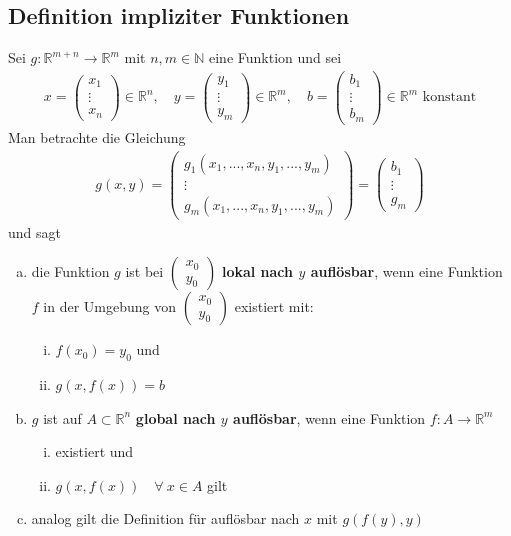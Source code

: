 \documentclass[11pt,a4paper]{book}
\newcommand {\Rn}	{\mathbb{R}^n}
\newcommand {\Rm}	{\mathbb{R}^m}
\newcommand {\Rmn}	{\mathbb{R}^{m+n}}
\newcommand {\N}	{\mathbb{N}}
\newcommand{\1}    	{\mathbbm{1}}
\begin{document}
\subsection{Definition impliziter Funktionen}
Sei \(g: \Rmn \rightarrow \Rm\) mit \(n,m \in \N\) eine Funktion und sei
\begin{align*}
	x = \left( \begin{array}{c}
		x_1 \\ \vdots \\ x_n
	\end{array} \right) \in \Rn, \quad
	y = \left( \begin{array}{c}
		y_1 \\ \vdots \\ y_m
	\end{array} \right) \in \Rm, \quad
	b = \left( \begin{array}{c}
		b_1 \\ \vdots \\ b_m
	\end{array} \right) \in \Rm \textrm{ konstant}
\end{align*}
Man betrachte die Gleichung
\begin{align*}
	g(x,y) = \left( \begin{array}{c}
		g_1(x_1, ..., x_n, y_1, ..., y_m) \\
		\vdots \\
		g_m(x_1, ..., x_n, y_1, ..., y_m)
	\end{array} \right) = \left( \begin{array}{c}
		b_1 \\ \vdots \\ g_m
	\end{array} \right)
\end{align*}
und sagt
\begin{enumerate}[a.~]
	\item die Funktion \(g\) ist bei \(\left(\begin{array}{c} x_0 \\ y_0 \end{array} \right) \) \textbf{lokal nach \(y\) auflösbar}, wenn eine Funktion \(f\) in der Umgebung von \(\left(\begin{array}{c} x_0 \\ y_0 \end{array} \right) \) existiert mit:
	\begin{enumerate}[(i)]
		\item \(f(x_0) = y_0\) und
		\item \(g(x, f(x)) = b\)
	\end{enumerate}
	\item \(g\) ist auf \(A \subset \Rn\) \textbf{global nach \(y\) auflösbar}, wenn eine Funktion \(f : A \rightarrow \Rm\)
	\begin{enumerate}[(i)]
		\item existiert und
		\item \(g(x,f(x)) \quad \forall~ x \in A\) gilt
	\end{enumerate}
	\item analog gilt die Definition für auflösbar nach \(x\) mit \(g(f(y),y)\)
\end{enumerate}
\end{document}
